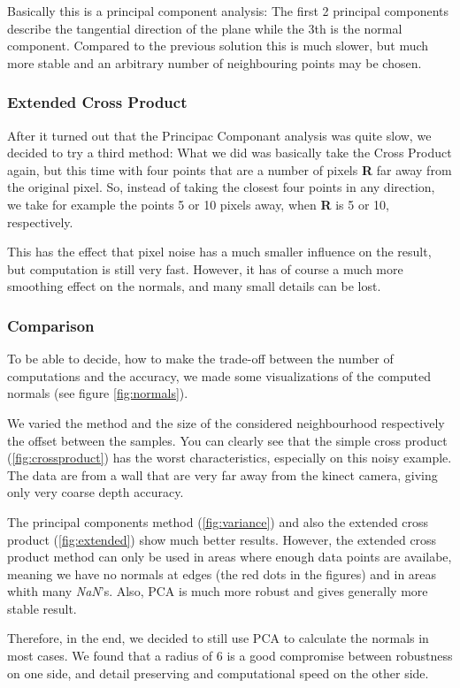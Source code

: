 \documentclass[10pt,twocolumn,letterpaper]{article}
\begin{document}
Basically this is a principal component analysis: The first 2 principal components describe the tangential direction of
the plane while the 3th is the normal component.
Compared to the previous solution this is much slower, but much more stable and an arbitrary number of neighbouring points may be chosen.

\subsubsection{Extended Cross Product}
After it turned out that the Principac Componant analysis was quite slow, we decided to try a third method: What we did was basically take the Cross
Product again, but this time with four points that are a number of pixels \textbf{R} far away from the original pixel. So, instead of taking the closest
four points in any direction, we take for example the points 5 or 10 pixels away, when \textbf{R} is 5 or 10, respectively.

This has the effect that pixel noise has a much smaller influence on the result, but computation is still very fast. However, it has of course a much more
smoothing effect on the normals, and many small details can be lost.

\subsubsection{Comparison}
To be able to decide, how to make the trade-off between the number of computations and the accuracy, we made some visualizations of the computed
normals (see figure \ref{fig:normals}).

We varied the method and the size of the considered neighbourhood respectively the offset between the samples. You can clearly see that the simple cross
product (\ref{fig:crossproduct}) has the worst characteristics, especially on this noisy example. The data are from a wall that are very far away from
the kinect camera, giving only very coarse depth accuracy.

The principal components method (\ref{fig:variance}) and also the extended cross product (\ref{fig:extended}) show much better results. However, the
extended cross product method can only be used in areas where enough data points are availabe, meaning we have no normals at edges (the red dots in 
the figures) and in areas whith many \textit{NaN}'s. Also, PCA is much more robust and gives generally more stable result.

Therefore, in the end, we decided to still use PCA to calculate the normals in most cases. We found that a radius of 6 is a good compromise between
robustness on one side, and detail preserving and computational speed on the other side.
\end{document}
